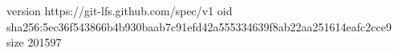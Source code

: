 version https://git-lfs.github.com/spec/v1
oid sha256:5ec36f543866b4b930baab7c91efd42a555334639f8ab22aa251614eafc2cce9
size 201597
